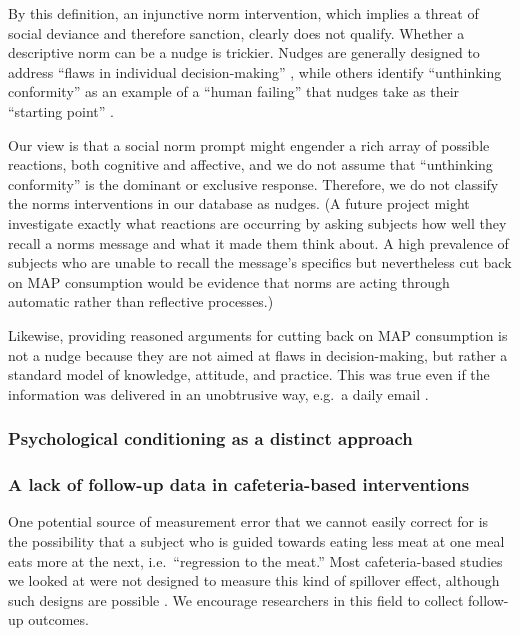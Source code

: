 \documentclass[sn-nature,pdflatex]{sn-jnl}
\begin{document}
By this definition, an injunctive norm intervention, which implies a
threat of social deviance and therefore sanction, clearly does not
qualify. Whether a descriptive norm can be a nudge is trickier. Nudges
are generally designed to address ``flaws in individual
decision-making'' \citep[126]{hausman2010}, while others identify
``unthinking conformity'' as an example of a ``human failing'' that
nudges take as their ``starting point'' \citep[4]{mols2015}.

Our view is that a social norm prompt might engender a rich array of
possible reactions, both cognitive and affective, and we do not assume
that ``unthinking conformity'' is the dominant or exclusive response.
Therefore, we do not classify the norms interventions in our database as
nudges. (A future project might investigate exactly what reactions are
occurring by asking subjects how well they recall a norms message and
what it made them think about. A high prevalence of subjects who are
unable to recall the message's specifics but nevertheless cut back on
MAP consumption would be evidence that norms are acting through
automatic rather than reflective processes.)

Likewise, providing reasoned arguments for cutting back on MAP
consumption is not a nudge because they are not aimed at flaws in
decision-making, but rather a standard model of knowledge, attitude, and
practice. This was true even if the information was delivered in an
unobtrusive way, e.g.~a daily email \citep{banerjee2019}.

\subsubsection{Psychological conditioning as a distinct
approach}\label{psychological-conditioning-as-a-distinct-approach}

\subsubsection{A lack of follow-up data in cafeteria-based
interventions}\label{a-lack-of-follow-up-data-in-cafeteria-based-interventions}

One potential source of measurement error that we cannot easily correct
for is the possibility that a subject who is guided towards eating less
meat at one meal eats more at the next, i.e.~``regression to the meat.''
Most cafeteria-based studies we looked at were not designed to measure
this kind of spillover effect, although such designs are possible
\citep{vocski2024}. We encourage researchers in this field to collect
follow-up outcomes.
\end{document}
